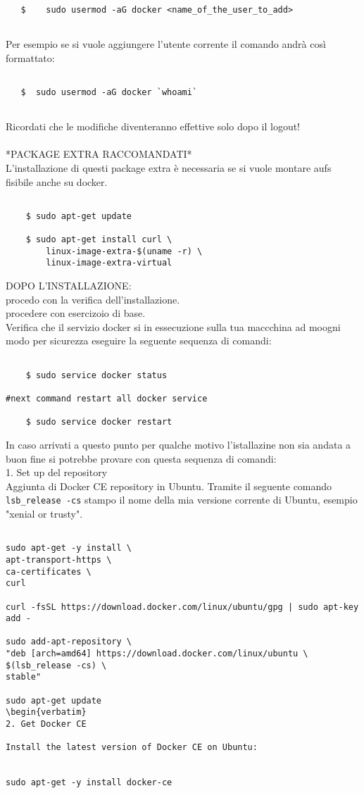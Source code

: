 \begin{verbatim}

   $	sudo usermod -aG docker <name_of_the_user_to_add>
  	
\end{verbatim}  
Per esempio se si vuole aggiungere l'utente corrente il comando andrà così formattato:
\begin{verbatim}
  
   $  sudo usermod -aG docker `whoami`
    
\end{verbatim}
Ricordati che le modifiche diventeranno effettive solo dopo il logout!\\\\
*PACKAGE EXTRA RACCOMANDATI*\\
L'installazione di questi package extra è necessaria se si vuole montare aufs fisibile anche su docker.
\begin{verbatim}

	$ sudo apt-get update
	
	$ sudo apt-get install curl \
	    linux-image-extra-$(uname -r) \
	    linux-image-extra-virtual

\end{verbatim}
DOPO L'INSTALLAZIONE:\\
procedo con la verifica dell'installazione.\\
procedere con esercizoio di base.\\
Verifica che il servizio docker si in essecuzione sulla tua maccchina ad moogni modo per  sicurezza eseguire la seguente sequenza di comandi:
\begin{verbatim}

	$ sudo service docker status

#next command restart all docker service

	$ sudo service docker restart

\end{verbatim}
In caso arrivati a questo punto per qualche motivo l'istallazine non sia andata a buon fine si potrebbe provare con questa sequenza di comandi:\\
1. Set up del repository\\
Aggiunta di Docker CE repository in Ubuntu. Tramite il seguente comando \texttt{lsb\_release -cs} stampo il nome della mia versione corrente di Ubuntu, esempio "xenial or trusty".
\begin{verbatim}

sudo apt-get -y install \
apt-transport-https \
ca-certificates \
curl

curl -fsSL https://download.docker.com/linux/ubuntu/gpg | sudo apt-key add -

sudo add-apt-repository \
"deb [arch=amd64] https://download.docker.com/linux/ubuntu \
$(lsb_release -cs) \
stable"

sudo apt-get update
\begin{verbatim}
2. Get Docker CE

Install the latest version of Docker CE on Ubuntu:


sudo apt-get -y install docker-ce

\end{verbatim}
